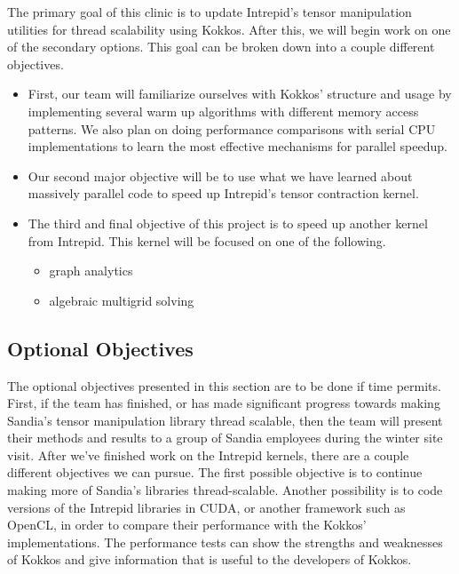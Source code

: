 \documentclass[proposal]{hmcclinic}
\begin{document}
The primary goal of this clinic is to update Intrepid's tensor
manipulation utilities for thread scalability using Kokkos. After this, we will begin work
on one of the secondary options. This goal can
be broken down into a couple different objectives. 
\begin{itemize}
    \item First, our team will familiarize ourselves with Kokkos' structure and
        usage by implementing several warm up algorithms with different memory
        access patterns.  We also plan on doing performance comparisons with
        serial CPU implementations to learn the most effective mechanisms for
        parallel speedup.
    \item Our second major objective will be to use what we have learned about
        massively parallel code to speed up Intrepid's tensor contraction
        kernel.
    \item The third and final objective of this project is to speed up another
        kernel from Intrepid.  This kernel will be focused on one of the
        following.
        \begin{itemize}
            \item graph analytics
            \item algebraic multigrid solving
        \end{itemize}
\end{itemize}

\subsection{Optional Objectives}

The optional objectives presented in this section are to be done if time
permits. First, if the team has finished, or has made significant progress
towards making Sandia's tensor manipulation library thread scalable, then the
team will present their methods and results to a group of Sandia employees
during the winter site visit.  After we've finished work on the Intrepid
kernels, there are a couple different objectives we can pursue.  The first
possible objective is to continue making more of Sandia's libraries
thread-scalable. Another possibility is to code versions of the Intrepid
libraries in CUDA, or another framework such as OpenCL, in order to compare
their performance with the Kokkos' implementations. The performance tests can
show the strengths and weaknesses of Kokkos and give information that is useful
to the developers of Kokkos.
\end{document}
